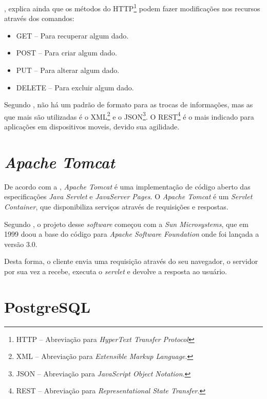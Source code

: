 	\par {}, explica ainda que os métodos do HTTP\footnote{
 HTTP – Abreviação para \textit{HyperText Transfer Protocol}} podem fazer
 modificações nos recursos através dos comandos:
	 
	 \begin{itemize}
	   \item GET – Para recuperar algum dado. 
	   \item POST – Para criar algum dado.
	   \item PUT – Para alterar algum dado. 
	   \item DELETE – Para excluir algum dado. 
	 \end{itemize}
	 
	\par Segundo , não há um padrão de formato para as
 trocas de informações, mas as que mais são utilizadas é o XML\footnote{XML –
 Abreviação para \textit{Extensible Markup Language}.} e o JSON\footnote{JSON –
 Abreviação para \textit{JavaScript Object Notation}.}. O REST\footnote{REST –
 Abreviação para \textit{Representational State Transfer}.} é o mais indicado
 para aplicações em dispositivos moveis, devido sua agilidade.
	
	
\section{\textit{Apache Tomcat}}

	\par De acordo com a , \textit{Apache Tomcat} é uma
implementação de código aberto das especificações \textit{Java Servlet} e
\textit{JavaServer Pages}. O \textit{Apache Tomcat}  é um \textit{Servlet
Container}, que disponibiliza serviços através de requisições e respostas.
	
	\par Segundo , o projeto desse \textit{software} começou
com a \textit{Sun Microsystems}, que em 1999 doou a base do código para
\textit{Apache Software Foundation} onde foi lançada a versão 3.0.
	
	\par Desta forma, o cliente envia uma requisição através do seu navegador, o
servidor por sua vez a recebe, executa o \textit{servlet} e devolve a resposta
ao usuário.

\section{PostgreSQL}

